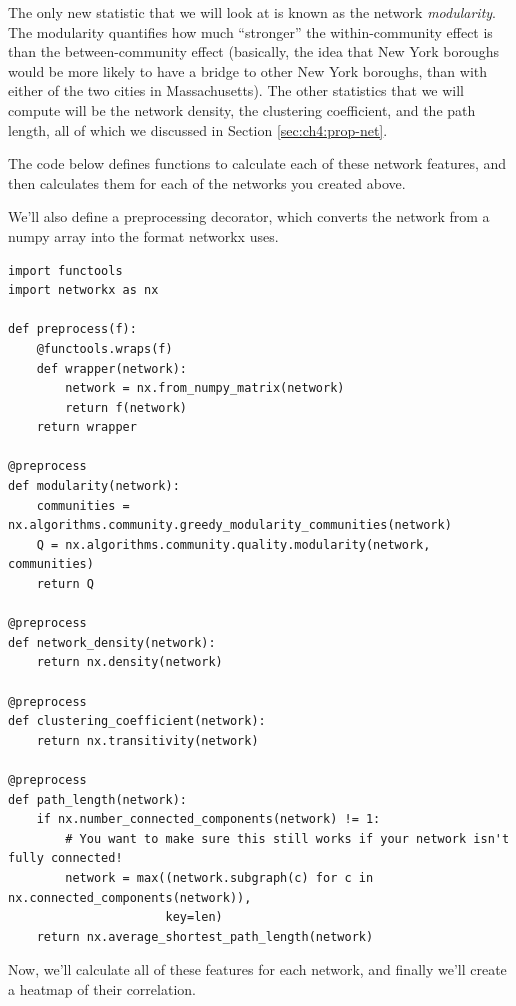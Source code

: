 The only new statistic that we will look at is known as the network \textit{modularity}. The modularity quantifies how much ``stronger'' the within-community effect is than the between-community effect (basically, the idea that New York boroughs would be more likely to have a bridge to other New York boroughs, than with either of the two cities in Massachusetts). The other statistics that we will compute will be the network density, the clustering coefficient, and the path length, all of which we discussed in Section \ref{sec:ch4:prop-net}.

The code below defines functions to calculate each of these network features, and then calculates them for each of the networks you created above.

We'll also define a preprocessing decorator, which converts the network from a numpy array into the format networkx uses.


\begin{lstlisting}[style=python]
import functools
import networkx as nx

def preprocess(f):
    @functools.wraps(f)
    def wrapper(network):
        network = nx.from_numpy_matrix(network)
        return f(network)
    return wrapper

@preprocess
def modularity(network):
    communities = nx.algorithms.community.greedy_modularity_communities(network)
    Q = nx.algorithms.community.quality.modularity(network, communities)
    return Q

@preprocess
def network_density(network):
    return nx.density(network)

@preprocess
def clustering_coefficient(network):
    return nx.transitivity(network)

@preprocess
def path_length(network):
    if nx.number_connected_components(network) != 1:
        # You want to make sure this still works if your network isn't fully connected!
        network = max((network.subgraph(c) for c in nx.connected_components(network)), 
                      key=len)
    return nx.average_shortest_path_length(network)
\end{lstlisting}

Now, we'll calculate all of these features for each network, and finally we'll create a heatmap of their correlation.

